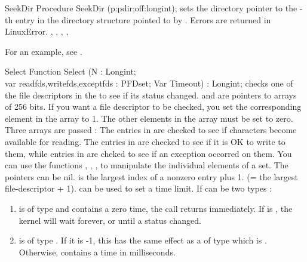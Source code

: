 \begin{procedure}{SeekDir}
\Declaration
Procedure SeekDir (p:pdir;off:longint);
\Description
  sets the directory pointer to the -th entry in the
directory structure pointed to by .
\Errors
Errors are returned in LinuxError.
\SeeAlso
{}, , , ,
\end{procedure}
For an example, see .

\begin{function}{Select}
\Declaration
Function Select (N : Longint; \\ var readfds,writefds,exceptfds : PFDset;
Var Timeout) : Longint;
\Description
{} checks one of the file descriptors in the  to see if its
status changed.
 and  are pointers to arrays of 256
bits. If you want a file descriptor to be checked, you set the
corresponding element in the array to 1. The other elements in the array
must be set to zero. Three arrays are passed : The entries in 
are checked to see if characters become available for reading. The entries
in  are checked to see if it is OK to write to them, while
entries in  are cheked to see if an exception occorred on
them.
You can use the functions , , 
,  to manipulate the individual elements of a set.
The pointers can be nil.
 is the largest index of a nonzero entry plus 1. (= the largest
file-descriptor + 1).
 can be used to set a time limit. 
If  can be two types :
\begin{enumerate}
\item {} is of type  and contains a
zero time, the call returns immediately. If  is , the
kernel will wait forever, or until a status changed.    
\item {} is of type . If it is -1, this has the same
effect as a  of type   which is .
Otherwise,  contains a time in milliseconds.
\end{enumerate}
 

\end{function}
